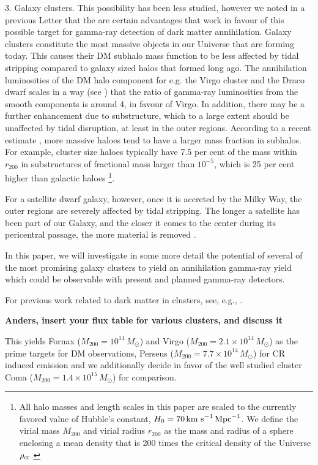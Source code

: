 \documentclass[10pt,aps,pra,reprint,amsmath,amsfonts,amssymb,showpacs]{revtex4-1}
\newcommand{\msun}{M_\odot}
\newcommand{\rvir}{r_{200}}
\newcommand{\mvir}{M_{200}}
\begin{document}
3. Galaxy clusters. This possibility has been less studied, however we
noted in a previous Letter \cite{2009PhRvL.103r1302P} that the are
certain advantages that work in favour of this possible target for
gamma-ray detection of dark matter annihilation.  Galaxy clusters
constitute the most massive objects in our Universe that are forming
today. This causes their DM subhalo mass function to be less affected
by tidal stripping compared to galaxy sized halos that formed long
ago.  The annihilation luminosities of the DM halo component for
e.g. the Virgo cluster and the Draco dwarf scales in a way (see
\cite{2009PhRvL.103r1302P}) that the ratio of gamma-ray luminosities
from the smooth components is around 4, in favour of Virgo. In
addition, there may be a further enhancement due to substructure,
which to a large extent should be unaffected by tidal disruption, at
least in the outer regions.  According to a recent estimate
\cite{2011MNRAS.410.2309G}, more massive haloes tend to have a larger
mass fraction in subhalos.  For example, cluster size haloes typically
have 7.5 per cent of the mass within $r_{200}$ in substructures of
fractional mass larger than $10^{-5}$, which is 25 per cent higher
than galactic haloes \footnote{All halo masses and length scales in
  this paper are scaled to the currently favored value of Hubble's
  constant, $H_0 = 70\, \rm{km~s}^{-1}\,\rm{Mpc}^{-1}$. We define the
  virial mass $\mvir$ and virial radius $\rvir$ as the mass and radius
  of a sphere enclosing a mean density that is 200 times the critical
  density of the Universe $\rho_{\rm{cr}}$.}.

For a satellite dwarf galaxy, however, once it is accreted by the
Milky Way, the outer regions are severely affected by tidal
stripping. The longer a satellite has been part of our Galaxy, and the
closer it comes to the center during its pericentral passage, the more
material is removed \cite{2004MNRAS.355..819G}.

In this paper, we will investigate in some more detail the potential
of several of the most promising galaxy clusters to yield an
annihilation gamma-ray yield which could be observable with present
and planned gamma-ray detectors.

For previous work related to dark matter in clusters, see, e.g.,
\cite{2006A&A...455...21C,2009PhRvD..80b3005J}. 


{\bf Anders, insert your flux table for various clusters, and discuss it}

This yields Fornax ($\mvir=10^{14}\,\msun$) and Virgo
($\mvir=2.1\times10^{14}\,\msun$) \cite{} as the prime targets for DM
observations, Perseus ($\mvir=7.7\times10^{14}\,\msun$) for CR induced
emission and we additionally decide in favor of the well studied
cluster Coma ($\mvir=1.4\times10^{15}\,\msun$) for comparison.
\end{document}

